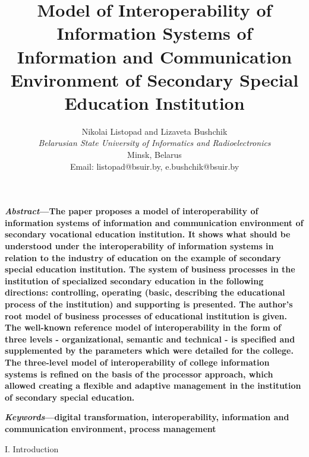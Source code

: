 \documentclass[10pt, a4paper]{article}
\title{ \textbf{Model of Interoperability of Information
Systems of Information and Communication
Environment of Secondary Special Education
Institution}}
\author{Nikolai Listopad and Lizaveta Bushchik\\
 \textit{Belarusian State University of Informatics and Radioelectronics}\\
Minsk, Belarus\\
Email: listopad@bsuir.by, e.bushchik@bsuir.by}
\date{}
\begin{document}
\maketitle
\begin{multicols}{2}
\textbf{\textit{Abstract}—The paper proposes a model of interoperability
of information systems of information and communication
environment of secondary vocational education institution.
It shows what should be understood under the interoperability of information systems in relation to the industry of
education on the example of secondary special education
institution. The system of business processes in the institution of specialized secondary education in the following
directions: controlling, operating (basic, describing the
educational process of the institution) and supporting is
presented. The author’s root model of business processes
of educational institution is given. The well-known reference
model of interoperability in the form of three levels -
organizational, semantic and technical - is specified and
supplemented by the parameters which were detailed for
the college. The three-level model of interoperability of
college information systems is refined on the basis of the
processor approach, which allowed creating a flexible and
adaptive management in the institution of secondary special
education. }
\par
\textbf{ \textit{Keywords}—digital transformation, interoperability, information and communication environment, process management}
\par
\begin{center}
  I. Introduction
\end{center}


\end{multicols}
\end{document}
